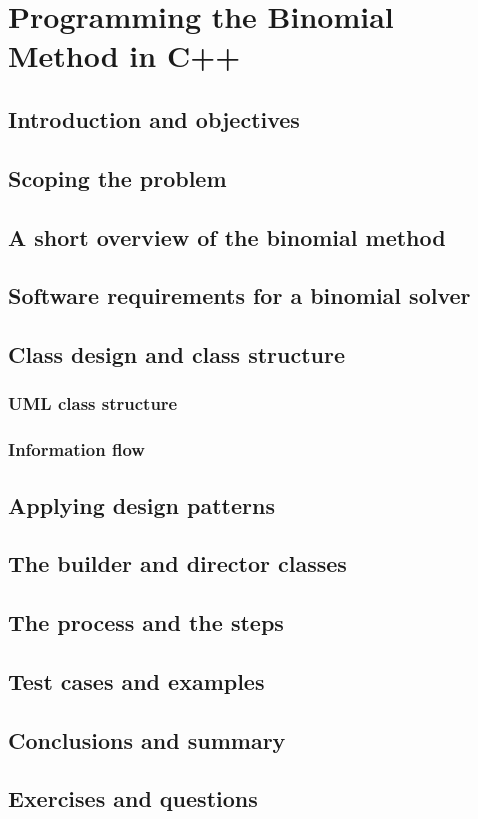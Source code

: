 \chapter{Programming the Binomial Method in C++}

\section{Introduction and objectives}
\section{Scoping the problem}
\section{A short overview of the binomial method}
\section{Software requirements for a binomial solver}
\section{Class design and class structure}

\subsection{UML class structure}
\subsection{Information flow}

\section{Applying design patterns}
\section{The builder and director classes}
\section{The process and the steps}
\section{Test cases and examples}
\section{Conclusions and summary}
\section{Exercises and questions}